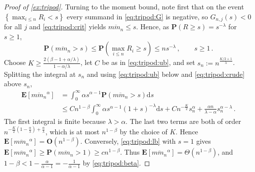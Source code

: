 \documentclass{article}
\newcommand*{\mo}[1]{\mathbf{#1}}
\newcommand{\lcb}{\left\lbrace} %
\newcommand{\rcb}{\right\rbrace} %
\newcommand{\cb}[1]{\lcb #1 \rcb} %
\newcommand{\lab}{\left[} %
\newcommand{\rab}{\right]} %
\newcommand{\ab}[1]{\lab #1 \rab} %
\newcommand{\abOf}[1]{\!\ab{#1}} %
\newcommand{\lb}{\left(} %
\newcommand{\rb}{\right)} %
\newcommand{\br}[1]{\lb #1 \rb} %
\newcommand{\brOf}[1]{\!\br{#1}} %
\renewcommand{\Pr}{\mathbf{P}} %
\newcommand{\PrOf}[1]{\Pr\brOf{#1}}
\newcommand{\E}{\mathbf{E}} %
\newcommand{\EOf}[1]{\E\abOf{#1}}
\newcommand{\eqcm}{\,,} %
\newcommand{\eqfs}{\,.}
\newcommand{\dl}{\mathrm{d}} %
\newcommand{\ol}[2]{\overline{#1#2}}
\begin{document}
\begin{proof}[Proof of \cref{ex:tripod}]
    Turning to the moment bound, note first that on the event $\cb{\max_{i\leq n}R_i < s}$ every summand in \eqref{eq:tripod:G} is negative, so $G_{n,j}(s)<0$ for all $j$ and \eqref{eq:tripod:crit} yields $\ol m{m_n}\leq s$. Hence, as $\PrOf{R\geq s} = s^{-\lambda}$ for $s\geq1$,
    \begin{equation}\label{eq:tripod:crude}
        \PrOf{\ol m{m_n}>s}
        \leq
        \PrOf{\max_{i\leq n}R_i\geq s}
        \leq
        n s^{-\lambda}
        \eqcm\qquad
        s\geq1
        \eqfs
    \end{equation}
    Choose $K \geq \frac{2(\beta-1+\alpha/\lambda)}{1-\alpha/\lambda}$, let $C$ be as in \eqref{eq:tripod:ub}, and set $s_n := n^{\frac{K/2+1}{\lambda}}$. Splitting the integral at $s_n$ and using \eqref{eq:tripod:ub} below and \eqref{eq:tripod:crude} above $s_n$,
    \begin{align}
        \EOf{\ol m{m_n}^\alpha}
        &=
        \int_0^\infty \alpha s^{\alpha-1}\PrOf{\ol m{m_n}>s}\dl s
        \\&\leq
        C n^{1-\beta}\int_0^\infty \alpha s^{\alpha-1}\br{1+s}^{-\lambda}\dl s
        + C n^{-\frac K2}s_n^\alpha
        + \frac{\alpha n}{\lambda-\alpha}s_n^{\alpha-\lambda}
        \eqfs
    \end{align}
    The first integral is finite because $\lambda>\alpha$. The last two terms are both of order $n^{-\frac K2\br{1-\frac\alpha\lambda}+\frac\alpha\lambda}$, which is at most $n^{1-\beta}$ by the choice of $K$. Hence $\EOf{\ol m{m_n}^\alpha} = \mo O\br{n^{1-\beta}}$. Conversely, \eqref{eq:tripod:lb} with $s=1$ gives
    $\EOf{\ol m{m_n}^\alpha} \geq \PrOf{\ol m{m_n}>1} \geq c  n^{1-\beta}$.
    Thus $\EOf{\ol m{m_n}^\alpha} = \Theta\br{n^{1-\beta}}$, and $1-\beta<1-\frac{\alpha}{\alpha-1} = -\frac1{\alpha-1}$ by \eqref{eq:tripod:beta}.
\end{proof}

%
\end{document}
